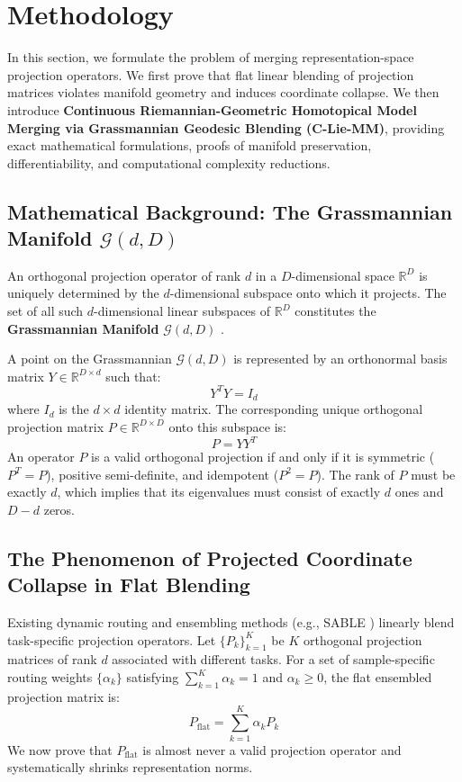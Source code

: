 \section{Methodology}
\label{sec:method}

In this section, we formulate the problem of merging representation-space projection operators. We first prove that flat linear blending of projection matrices violates manifold geometry and induces coordinate collapse. We then introduce \textbf{Continuous Riemannian-Geometric Homotopical Model Merging via Grassmannian Geodesic Blending (C-Lie-MM)}, providing exact mathematical formulations, proofs of manifold preservation, differentiability, and computational complexity reductions.

\subsection{Mathematical Background: The Grassmannian Manifold $\mathcal{G}(d, D)$}
An orthogonal projection operator of rank $d$ in a $D$-dimensional space $\mathbb{R}^D$ is uniquely determined by the $d$-dimensional subspace onto which it projects. The set of all such $d$-dimensional linear subspaces of $\mathbb{R}^D$ constitutes the \textbf{Grassmannian Manifold} $\mathcal{G}(d, D)$ \cite{absil08, edelman98}.

A point on the Grassmannian $\mathcal{G}(d, D)$ is represented by an orthonormal basis matrix $Y \in \mathbb{R}^{D \times d}$ such that:
\begin{equation}
    Y^T Y = I_d
\end{equation}
where $I_d$ is the $d \times d$ identity matrix. The corresponding unique orthogonal projection matrix $P \in \mathbb{R}^{D \times D}$ onto this subspace is:
\begin{equation}
    P = Y Y^T
\end{equation}
An operator $P$ is a valid orthogonal projection if and only if it is symmetric ($P^T = P$), positive semi-definite, and idempotent ($P^2 = P$). The rank of $P$ must be exactly $d$, which implies that its eigenvalues must consist of exactly $d$ ones and $D-d$ zeros.

\subsection{The Phenomenon of Projected Coordinate Collapse in Flat Blending}
Existing dynamic routing and ensembling methods (e.g., SABLE \cite{dauner23}) linearly blend task-specific projection operators. Let $\{P_k\}_{k=1}^K$ be $K$ orthogonal projection matrices of rank $d$ associated with different tasks. For a set of sample-specific routing weights $\{\alpha_k\}$ satisfying $\sum_{k=1}^K \alpha_k = 1$ and $\alpha_k \geq 0$, the flat ensembled projection matrix is:
\begin{equation}
    P_{\text{flat}} = \sum_{k=1}^K \alpha_k P_k
\end{equation}
We now prove that $P_{\text{flat}}$ is almost never a valid projection operator and systematically shrinks representation norms.

